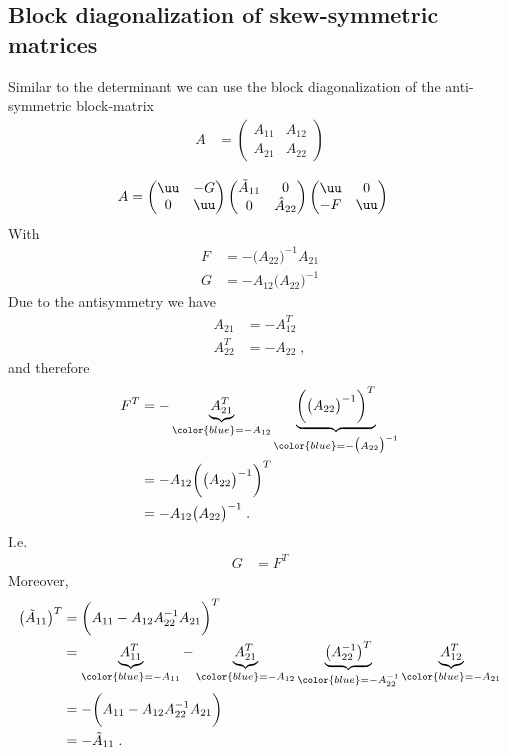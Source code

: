 \subsection{Block diagonalization of skew-symmetric matrices}
Similar to the determinant we can use the block diagonalization of  the anti-symmetric block-matrix
%
\begin{align*}
A &= 
\begin{pmatrix}
 A_{11} & A_{12}\\
A_{21} & A_{22}
\end{pmatrix}
\end{align*}

%
\begin{align}\label{eq:hatA}
A &=
\begin{pmatrix}
  \uu& -G  \\
  0 & \uu
\end{pmatrix}
%
\begin{pmatrix}
  \tilde A_{11}& 0 \\
0  & \hat A_{22}
\end{pmatrix}
\begin{pmatrix}
  \uu& 0  \\
  -F & \uu
\end{pmatrix} 
\end{align}
%
With
\begin{align*}
F &=  - \big(A_{22}\big)^{-1} A_{21}\\
G&= -  A_{12}\big( A_{22}\big)^{-1}
\end{align*}
Due to the antisymmetry we have 
%
\begin{align*}
A_{21} &= - A_{12}^{T}\\
 A_{22}^{T} &= - A_{22}\;,
\end{align*}
%
and therefore
%
\begin{align*}
F^{T} &= - \underbrace{
A_{21}^{T}
}_{\color{blue} = -  A_{12}} 
\underbrace{
\bigg( \big(A_{22}\big)^{-1} \bigg)^{T}
}_{\color{blue} = -\big(A_{22}  \big)^{-1} }\\
&= - A_{12} \bigg( \big(A_{22}  \big)^{-1} \bigg)^{T}\\
&= - A_{12} \big(A_{22}  \big)^{-1} \;.
\end{align*}
%
I.e.
%
\begin{align}\label{eq:}
G &= F^{T}
\end{align}
Moreover,
%
\begin{align*}
\big(\tilde A_{11} \big)^{T} &= \bigg( A_{11} - A_{12} A_{22}^{-1} A_{21} \bigg)^{T}\\
&=\underbrace{
 A_{11}^{T}
}_{\color{blue} = -A_{11}} - \underbrace{
A_{21}^{T}
}_{\color{blue} = -A_{12}} \underbrace{
\big(A_{22}^{-1}\big)^{T} 
}_{\color{blue} = -A_{22}^{-1}}
\underbrace{
A_{12}^{T}
}_{\color{blue} = -A_{21}}\\
&=-\bigg( A_{11} - A_{12} A_{22}^{-1}A_{21} \bigg)\\
&=- \tilde A_{11}\;.
\end{align*}
